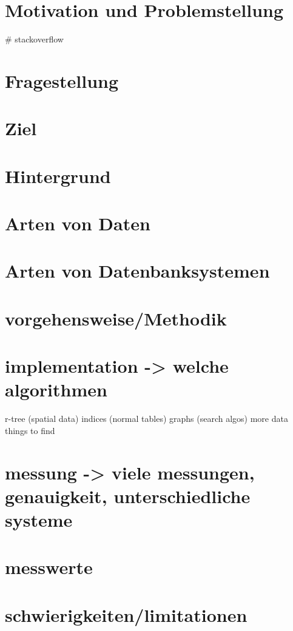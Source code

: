 \section{Motivation und Problemstellung}

\# stackoverflow

\section{Fragestellung}



\section{Ziel}



\section{Hintergrund}




\section{Arten von Daten}
\section{Arten von Datenbanksystemen}

\section{vorgehensweise/Methodik}
\section{implementation -> welche algorithmen}

r-tree (spatial data)
indices (normal tables)
graphs (search algos)
more data things to find

\section{messung -> viele messungen, genauigkeit, unterschiedliche systeme}
\section{messwerte}

\section{schwierigkeiten/limitationen}

